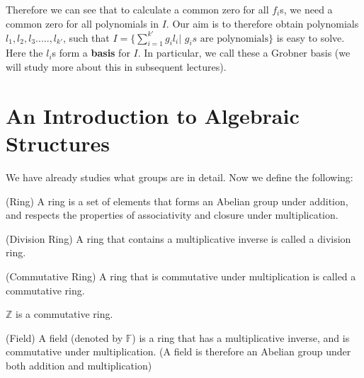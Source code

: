 Therefore we can see that to calculate a common zero for all $f_i$s, we need a common zero for all polynomials in $I$. Our aim is to therefore obtain polynomials $l_1,l_2,l_3.....,l_{k'}$, such that $I = \{\sum\limits_{i=1}^{k'} g_{i}l_{i}| \text{~}g_{i}s \text{~are polynomials}\}$ is easy to solve. Here the $l_i$s form a \textbf{basis} for $I$. In particular, we call these a Grobner basis (we will study more about this in subsequent lectures).\\

\section{An Introduction to Algebraic Structures} \label{sec:alg-defs}
We have already studies what groups are in detail. Now we define the following:
\begin{definition} (Ring)
A ring is a set of elements that forms an Abelian group under addition, and respects the properties of associativity and closure under multiplication.
\end{definition}
\begin{definition} (Division Ring)
A ring that contains a multiplicative inverse is called a division ring.
\end{definition}
\begin{definition} (Commutative Ring)
A ring that is commutative under multiplication is called a commutative ring.
\end{definition}
\begin{example}
$\mathbb{Z}$ is a commutative ring.
\end{example}
\begin{definition} (Field)
A field (denoted by $\mathbb{F}$) is a ring that has a multiplicative inverse, and is commutative under multiplication. (A field is therefore an Abelian group under both addition and multiplication)
\end{definition}

